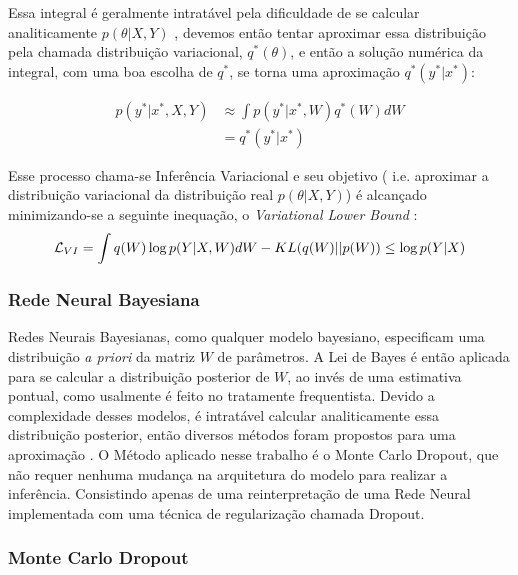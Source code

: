 Essa integral é geralmente intratável pela dificuldade de se calcular
analiticamente $p(\theta | X,Y)$ \citep{ubertime}, devemos então tentar aproximar essa distribuição
pela chamada distribuição variacional, $q^*(\theta)$, e então a solução numérica da integral, com uma boa escolha de $q^{*}$, se torna uma aproximação $q^{*}(y^{*}| x^{*})$: 

\begin{align*}
  \label {eq:pq}
    p(y^* | x^* , X,Y) &\approx \int  p(y^* | x^*,W) q^*(W)dW \\
                       &= q^*(y^* | x^*)
\end{align*}

Esse processo chama-se Inferência Variacional e seu objetivo ( i.e. aproximar a distribuição variacional da distribuição real $p(\theta | X,Y)$)
é alcançado minimizando-se a seguinte inequação, o \textit{Variational Lower Bound} \citep{bayesml}: \\

\begin{equation}
  \label {eq:ine}
  \mathcal{L}_{VI} = \int q(W) \log p(Y | X,W)dW - \mathnormal{KL}(q(W) ||p(W)) \\
                  \leq \log p(Y|X) 
\end{equation}



\subsubsection{Rede Neural Bayesiana}

Redes Neurais Bayesianas, como qualquer modelo bayesiano, especificam uma distribuição \textit{a priori} da matriz $W$ de parâmetros.
A Lei de Bayes é então aplicada para se calcular a distribuição posterior de $W$, ao invés de uma estimativa pontual, como usalmente é feito no tratamente frequentista.
Devido a complexidade desses modelos, é intratável calcular analiticamente essa distribuição posterior, então diversos métodos foram propostos para uma aproximação \cite{Gal2016Uncertainty}.
O Método aplicado nesse trabalho é o Monte Carlo Dropout, que não requer nenhuma mudança na arquitetura do modelo para realizar a inferência. Consistindo apenas de uma reinterpretação de uma Rede Neural implementada com uma técnica de regularização chamada Dropout. 

\subsubsection{Monte Carlo Dropout}

